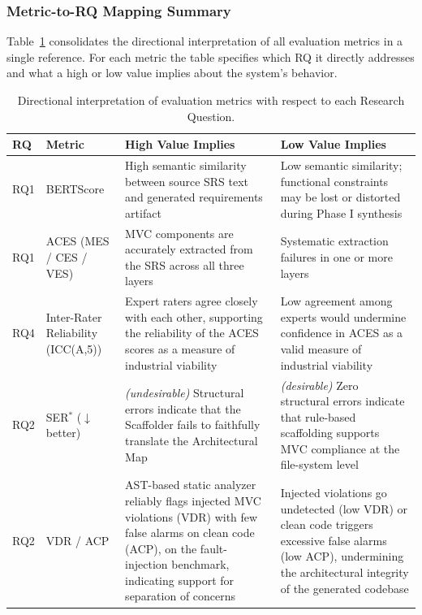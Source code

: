 \subsubsection{Metric-to-RQ Mapping Summary}

Table~\ref{tab:metric_rq_mapping} consolidates the directional interpretation of all evaluation metrics in a single reference. For each metric the table specifies which RQ it directly addresses and what a high or low value implies about the system's behavior.

\begin{table}[pos=h]
\centering
\caption{Directional interpretation of evaluation metrics with respect to each Research Question.}
\label{tab:metric_rq_mapping}
\renewcommand{\arraystretch}{1.3}
\begin{tabularx}{\textwidth}{@{} l l >{\raggedright\arraybackslash}X >{\raggedright\arraybackslash}X @{}}
\toprule
\textbf{RQ} & \textbf{Metric} & \textbf{High Value Implies} & \textbf{Low Value Implies} \\
\midrule
RQ1 & BERTScore & High semantic similarity between source SRS text and generated requirements artifact & Low semantic similarity; functional constraints may be lost or distorted during Phase I synthesis \\
\midrule
RQ1 & ACES (MES / CES / VES) & MVC components are accurately extracted from the SRS across all three layers & Systematic extraction failures in one or more layers \\
\midrule
RQ4 & Inter-Rater Reliability (ICC(A,5)) & Expert raters agree closely with each other, supporting the reliability of the ACES scores as a measure of industrial viability & Low agreement among experts would undermine confidence in ACES as a valid measure of industrial viability \\
\midrule
RQ2 & SER$^*$ ($\downarrow$ better) & \textit{(undesirable)} Structural errors indicate that the Scaffolder fails to faithfully translate the Architectural Map & \textit{(desirable)} Zero structural errors indicate that rule-based scaffolding supports MVC compliance at the file-system level \\
\midrule
RQ2 & VDR / ACP & AST-based static analyzer reliably flags injected MVC violations (VDR) with few false alarms on clean code (ACP), on the fault-injection benchmark, indicating support for separation of concerns & Injected violations go undetected (low VDR) or clean code triggers excessive false alarms (low ACP), undermining the architectural integrity of the generated codebase \\

\end{tabularx}
\end{table}
